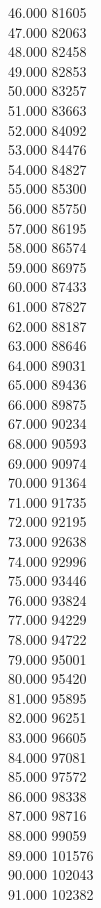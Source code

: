 { 46.000	81605 \\
 47.000	82063 \\
 48.000	82458 \\
 49.000	82853 \\
 50.000	83257 \\
 51.000	83663 \\
 52.000	84092 \\
 53.000	84476 \\
 54.000	84827 \\
 55.000	85300 \\
 56.000	85750 \\
 57.000	86195 \\
 58.000	86574 \\
 59.000	86975 \\
 60.000	87433 \\
 61.000	87827 \\
 62.000	88187 \\
 63.000	88646 \\
 64.000	89031 \\
 65.000	89436 \\
 66.000	89875 \\
 67.000	90234 \\
 68.000	90593 \\
 69.000	90974 \\
 70.000	91364 \\
 71.000	91735 \\
 72.000	92195 \\
 73.000	92638 \\
 74.000	92996 \\
 75.000	93446 \\
 76.000	93824 \\
 77.000	94229 \\
 78.000	94722 \\
 79.000	95001 \\
 80.000	95420 \\
 81.000	95895 \\
 82.000	96251 \\
 83.000	96605 \\
 84.000	97081 \\
 85.000	97572 \\
 86.000	98338 \\
 87.000	98716 \\
 88.000	99059 \\
 89.000	101576 \\
 90.000	102043 \\
 91.000	102382 \\
}
